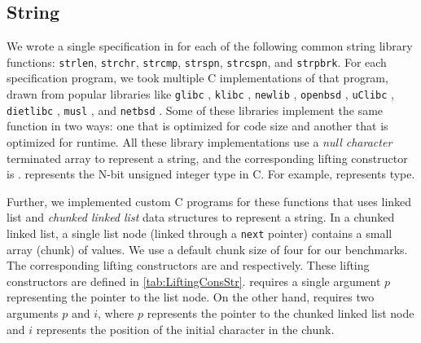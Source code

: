 

\subsection{String}
\label{sec:expstring}
We wrote a single specification in \SpecL{} for each of the following
common string library functions: {\tt strlen}, {\tt strchr}, {\tt strcmp}, {\tt strspn},
{\tt strcspn}, and {\tt strpbrk}.  For each specification
program, we took multiple C implementations of that program, drawn from popular
libraries like {\tt glibc} \cite{glibc}, {\tt klibc} \cite{klibc}, {\tt newlib} \cite{newlib},
{\tt openbsd} \cite{openbsdlibc}, {\tt uClibc} \cite{uclibc},
{\tt dietlibc} \cite{dietlibc}, {\tt musl} \cite{musl}, and {\tt netbsd} \cite{netbsd}.
Some of these libraries implement the same function in two ways: one that is optimized
for code size and another that is optimized for runtime.
All these library implementations use a {\em null character} terminated array to represent
a string, and the
corresponding lifting constructor is .
 represents the N-bit unsigned integer type in C.
For example,  represents  type.

Further, we implemented custom C programs for these functions that uses linked list
and {\em chunked linked list} data structures to represent a string.
In a chunked linked list, a single list node (linked through a {\tt next} pointer)
contains a small array (chunk) of values.
We use a default chunk size of four for our benchmarks.
The corresponding lifting constructors are 
and  respectively.
These lifting constructors are defined in \cref{tab:LiftingConsStr}.
 requires a single
argument $p$ representing the pointer to the list node.
On the other hand,  requires two arguments $p$
and $i$, where $p$ represents the pointer to the chunked linked list node
and $i$ represents the position of the initial character in the chunk.



